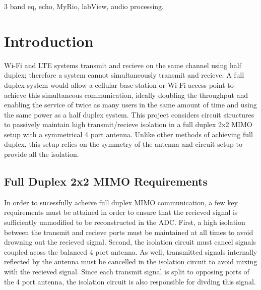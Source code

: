 \begin{IEEEkeywords}
3 band eq, echo, MyRio, labView, audio processing. 
\end{IEEEkeywords}

\IEEEpeerreviewmaketitle



\section{Introduction}
%
%
%
%
 Wi-Fi and LTE systems transmit and recieve on the same channel using half duplex; therefore a system cannot simultaneously transmit and recieve.
 A full duplex system would allow a cellular base station or Wi-Fi access point to achieve this simultaneous communication, ideally doubling the throughput and enabling the service of twice as many users in the same amount of time and using the same power as a half duplex system. 
 This project considers circuit structures to passively maintain high transmit/recieve isolation in a full duplex 2x2 MIMO setup with a symmetrical 4 port antenna. 
Unlike other methods of achieving full duplex, this setup relies on the symmetry of the antenna and circuit setup to provide all the isolation.
\subsection{Full Duplex 2x2 MIMO Requirements}
In order to sucessfully acheive full duplex MIMO communication, a few key requirements must be attained in order to ensure that the recieved signal is sufficiently unmodified to be reconstructed in the ADC. 
First, a high isolation between the transmit and recieve ports must be maintained at all times to avoid drowning out the recieved signal. 
Second, the isolation circuit must cancel signals coupled acoss the balanced 4 port antenna. 
As well, transmitted signals internally reflected by the antenna must be cancelled in the isolation circuit to avoid mixing with the recieved signal. 
Since each transmit signal is split to opposing ports of the 4 port antenna, the isolation circuit is also responsible for divding this signal.

